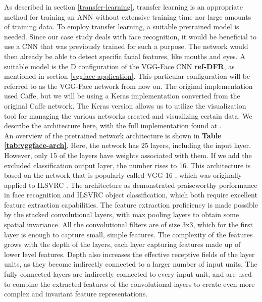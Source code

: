 As described in section \ref{transfer-learning}, transfer learning is an appropriate method for training an ANN without extensive training time nor large amounts of training data. To employ transfer learning, a suitable pretrained model is needed. Since our case study deals with face recognition, it would be beneficial to use a CNN that was previously trained for such a purpose. The network would then already be able to detect specific facial features, like mouths and eyes. A suitable model is the D configuration of the VGG-Face CNN \textbf{ref-DFR}, as mentioned in section \ref{vggface-application}. This particular configuration will be referred to as the VGG-Face network from now on. The original implementation used Caffe, but we will be using a Keras implementation converted from the original Caffe network. The Keras version allows us to utilize the visualization tool for managing the various networks created and visualizing certain data. We describe the architecture here, with the full implementation found at \cite{vggface-github}. \\

\noindent An overview of the pretrained network architecture is shown in \textbf{Table \ref{tab:vggface-arch}}. Here, the network has 25 layers, including the input layer. However, only 15 of the layers have weights associated with them. If we add the excluded classification output layer, the number rises to 16. This architecture is based on the network that is popularly called VGG-16 \cite{vgg}, which was originally applied to ILSVRC \cite{imagenet}. The architecture as demonstrated praiseworthy performance in face recognition and ILSVRC object classification, which both require excellent feature extraction capabilities. The feature extraction proficiency is made possible by the stacked convolutional layers, with max pooling layers to obtain some spatial invariance. All the convolutional filters are of size 3x3, which for the first layer is enough to capture small, simple features. The complexity of the features grows with the depth of the layers, each layer capturing features made up of lower level features. Depth also increases the effective receptive fields of the layer units, as they become indirectly connected to a larger number of input units. The fully connected layers are indirectly connected to every input unit, and are used to combine the extracted features of the convolutional layers to create even more complex and invariant feature representations. \\


